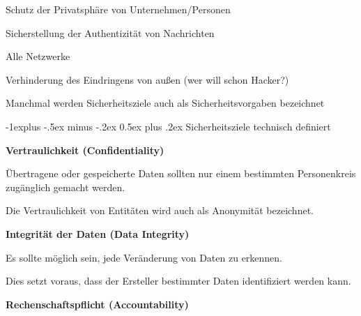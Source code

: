 \documentclass[a4paper]{article}
\makeatletter
\renewcommand{\subsection}{\@startsection{subsection}{2}{0mm}%
 {-1explus -.5ex minus -.2ex}%
 {0.5ex plus .2ex}%
 {\normalfont\normalsize\bfseries}}
\makeatother
\begin{document}
\begin{multicols}{3}
\begin{itemize*}
            \begin{itemize*}
                  \item Schutz der Privatsphäre von Unternehmen/Personen
                  \item Sicherstellung der Authentizität von Nachrichten
            \end{itemize*}
            \item
            Alle Netzwerke

            \begin{itemize*}
                  \item Verhinderung des Eindringens von außen (wer will schon Hacker?)
            \end{itemize*}
            \item
            Manchmal werden Sicherheitsziele auch als Sicherheitsvorgaben
            bezeichnet
      \end{itemize*}


      \subsection{Sicherheitsziele technisch
            definiert}

      \begin{itemize*}
            \item
            \textbf{Vertraulichkeit (Confidentiality)}

            \begin{itemize*}
                  \item Übertragene oder gespeicherte Daten sollten nur einem bestimmten Personenkreis zugänglich gemacht werden.
                  \item Die Vertraulichkeit von Entitäten wird auch als Anonymität bezeichnet.
            \end{itemize*}
            \item
            \textbf{Integrität der Daten (Data Integrity)}

            \begin{itemize*}
                  \item Es sollte möglich sein, jede Veränderung von Daten zu erkennen.
                  \item Dies setzt voraus, dass der Ersteller bestimmter Daten identifiziert werden kann.
            \end{itemize*}
            \item
            \textbf{Rechenschaftspflicht (Accountability)}


\end{itemize*}
\end{multicols}
\end{document}
